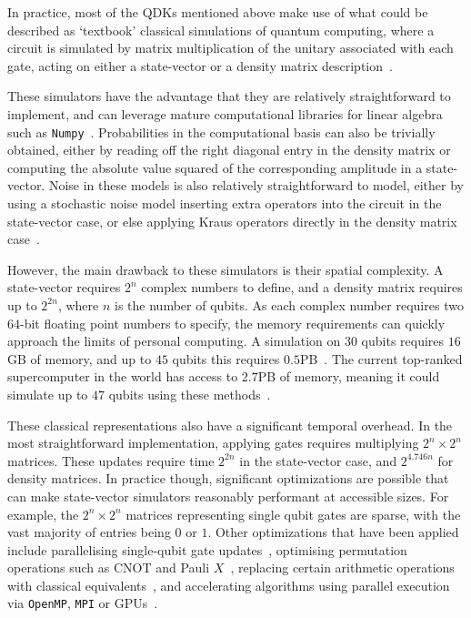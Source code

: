 In practice, most of the QDKs mentioned above make use of what could be described as `textbook' classical simulations of quantum computing, where a circuit is simulated by matrix multiplication of the unitary associated with each gate, acting on either a state-vector or a density matrix description~\cite{Nielsen2000}.\par
These simulators have the advantage that they are relatively straightforward to implement, and can leverage mature computational libraries for linear algebra such as \texttt{Numpy}~\cite{Numpy}. Probabilities in the computational basis can also be trivially obtained, either by reading off the right diagonal entry in the density matrix or computing the absolute value squared of the corresponding amplitude in a state-vector. Noise in these models is also relatively straightforward to model, either by using a stochastic noise model inserting extra operators into the circuit in the state-vector case, or else applying Kraus operators directly in the density matrix case~\cite{Nielsen2000}.\par
However, the main drawback to these simulators is their spatial complexity. A state-vector requires $2^{n}$ complex numbers to define, and a density matrix requires up to $2^{2n}$, where $n$ is the number of qubits. As each complex number requires two $64$-bit floating point numbers to specify, the memory requirements can quickly approach the limits of personal computing. A simulation on $30$ qubits requires $16$GB of memory, and up to $45$ qubits this requires $0.5$PB~\cite{Haner2016}. The current top-ranked supercomputer in the world has access to $2.7$PB of memory, meaning it could simulate up to $47$ qubits using these methods~\cite{Top500}.\par
These classical representations also have a significant temporal overhead. In the most straightforward implementation, applying gates requires multiplying $2^{n}\times 2^{n}$ matrices. These updates require time $2^{2n}$ in the state-vector case, and $2^{4.746n}$ for density matrices. In practice though, significant optimizations are possible that can make state-vector simulators reasonably performant at accessible sizes. For example, the $2^{n}\times 2^{n}$ matrices representing single qubit gates are sparse, with the vast  majority of entries being $0$ or $1$. Other optimizations that have been applied include parallelising single-qubit gate updates~\cite{Smelyanskiy2016,Khammassi2017,Smelyanskiy2016,QiskitAer}, optimising permutation operations such as CNOT and Pauli $X$~\cite{Khammassi2017}, replacing certain arithmetic operations with classical equivalents~\cite{Haner2016}, and accelerating algorithms using parallel execution via \texttt{OpenMP}, \texttt{MPI} or GPUs~\cite{Jones2018,Smelyanskiy2016,Khammassi2017,QiskitAer}.\par
